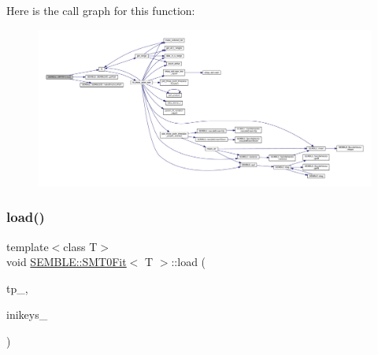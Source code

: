 Here is the call graph for this function\+:
\nopagebreak
\begin{figure}[H]
\begin{center}
\leavevmode
\includegraphics[width=350pt]{d6/dad/structSEMBLE_1_1SMT0Fit_a082e12f3695d20ca6acb97d221c30ad1_cgraph}
\end{center}
\end{figure}
\mbox{\label{structSEMBLE_1_1SMT0Fit_a082e12f3695d20ca6acb97d221c30ad1}} 
\subsubsection{\texorpdfstring{load()}{load()}\hspace{0.1cm}{\footnotesize\ttfamily [2/2]}}
{\footnotesize\ttfamily template$<$class T$>$ \\
void \mbox{\hyperlink{structSEMBLE_1_1SMT0Fit}{S\+E\+M\+B\+L\+E\+::\+S\+M\+T0\+Fit}}$<$ T $>$\+::load (\begin{DoxyParamCaption}\item[{const typename std\+::vector$<$ \mbox{\hyperlink{structSEMBLE_1_1SembleMatrix}{Semble\+Matrix}}$<$ T $>$ $>$ \&}]{tp\+\_\+,  }\item[{const Fit\+Ini\+Props\+\_\+t \&}]{inikeys\+\_\+ }\end{DoxyParamCaption})}

\mbox{\label{structSEMBLE_1_1SMT0Fit_a5b041e77bdb163f84968938f3f2a3850}} 
